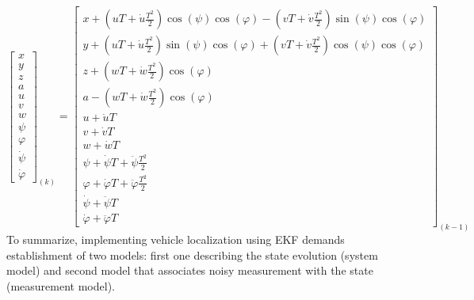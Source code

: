 \begin{equation}
\begin{bmatrix} x \\ y \\ z \\ a \\ u \\ v \\ w \\ \psi \\ \varphi \\ \dot{\psi} \\ \dot{\varphi} \end{bmatrix}_{(k)} =
\begin{bmatrix} x + (uT+\dot{u}\frac{T^{2}}{2})\cos(\psi)\cos(\varphi) - (vT+\dot{v}\frac{T^{2}}{2})\sin(\psi)\cos(\varphi) \\ 
                y + (uT+\dot{u}\frac{T^{2}}{2})\sin(\psi)\cos(\varphi) + (vT+\dot{v}\frac{T^{2}}{2})\cos(\psi)\cos(\varphi) \\ 
                z + (wT+\dot{w}\frac{T^{2}}{2})\cos(\varphi) \\ 
                a - (wT+\dot{w}\frac{T^{2}}{2})\cos(\varphi) \\ 
                u + \dot{u}T \\ 
                v + \dot{v}T \\ 
                w + \dot{w}T \\ 
                \psi    + \dot{\psi}T    + \ddot{\psi}   \frac{T^{2}}{2} \\ 
                \varphi + \dot{\varphi}T + \ddot{\varphi}\frac{T^{2}}{2} \\ 
                \dot{\psi}    + \ddot{\psi}T \\ 
                \dot{\varphi} + \ddot{\varphi}T
\end{bmatrix}_{(k-1)} 
\label{eq:state-tran-matrix}
\end{equation}
To summarize, implementing vehicle localization using EKF demands establishment of two models: first one describing the state evolution (system model) and second model that associates noisy measurement with the state (measurement model). 
